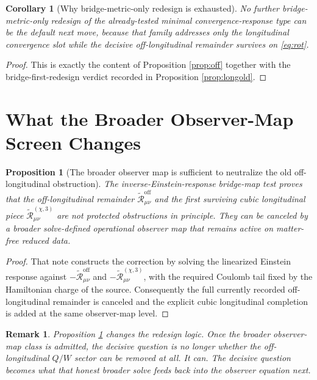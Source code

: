 \documentclass[11pt]{article}
\newcommand{\RemOff}{\widetilde{\mathcal R}_{\mu\nu}^{\mathrm{off}}}
\newcommand{\RemLongThree}{\widetilde{\mathcal R}_{\mu\nu}^{(\chi,3)}}
\newtheorem{proposition}{Proposition}
\newtheorem{remark}{Remark}
\newtheorem{corollary}{Corollary}
\begin{document}
\begin{corollary}[Why bridge-metric-only redesign is exhausted]
\label{cor:bridge}
No further bridge-metric-only redesign of the already-tested minimal convergence-response type can be the default next move, because that family addresses only the longitudinal convergence slot while the decisive off-longitudinal remainder survives on \eqref{eq:rot}.
\end{corollary}

\begin{proof}
This is exactly the content of Proposition \ref{prop:off} together with the bridge-first-redesign verdict recorded in Proposition \ref{prop:longold}.
\end{proof}

\section{What the Broader Observer-Map Screen Changes}

\begin{proposition}[The broader observer map is sufficient to neutralize the old off-longitudinal obstruction]
\label{prop:ier}
The inverse-Einstein-response bridge-map test proves that the off-longitudinal remainder \(\RemOff\) and the first surviving cubic longitudinal piece \(\RemLongThree\) are not protected obstructions in principle. They can be canceled by a broader solve-defined operational observer map that remains active on matter-free reduced data.
\end{proposition}

\begin{proof}
That note constructs the correction by solving the linearized Einstein response against \(-\RemOff\) and \(-\RemLongThree\), with the required Coulomb tail fixed by the Hamiltonian charge of the source. Consequently the full currently recorded off-longitudinal remainder is canceled and the explicit cubic longitudinal completion is added at the same observer-map level.
\end{proof}

\begin{remark}
Proposition \ref{prop:ier} changes the redesign logic. Once the broader observer-map class is admitted, the decisive question is no longer whether the off-longitudinal \(Q/W\) sector can be removed at all. It can. The decisive question becomes what that honest broader solve feeds back into the observer equation next.
\end{remark}
\end{document}
